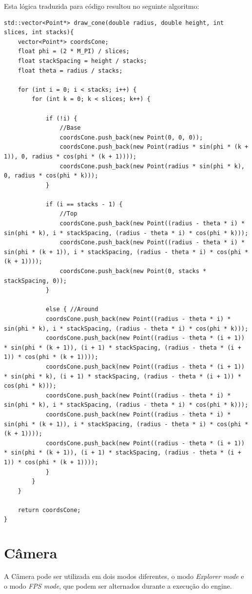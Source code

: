 \documentclass[a4paper]{article}
\begin{document}
Esta lógica traduzida para código resultou no seguinte algoritmo:

\begin{lstlisting}
std::vector<Point*> draw_cone(double radius, double height, int slices, int stacks){
    vector<Point*> coordsCone;
    float phi = (2 * M_PI) / slices;
    float stackSpacing = height / stacks;
    float theta = radius / stacks;

    for (int i = 0; i < stacks; i++) {
        for (int k = 0; k < slices; k++) {

            if (!i) {
                //Base
                coordsCone.push_back(new Point(0, 0, 0));
                coordsCone.push_back(new Point(radius * sin(phi * (k + 1)), 0, radius * cos(phi * (k + 1))));
                coordsCone.push_back(new Point(radius * sin(phi * k), 0, radius * cos(phi * k)));
            }

            if (i == stacks - 1) {
                //Top
                coordsCone.push_back(new Point((radius - theta * i) * sin(phi * k), i * stackSpacing, (radius - theta * i) * cos(phi * k)));
                coordsCone.push_back(new Point((radius - theta * i) * sin(phi * (k + 1)), i * stackSpacing, (radius - theta * i) * cos(phi * (k + 1))));
                coordsCone.push_back(new Point(0, stacks * stackSpacing, 0));
            }

            else { //Around
            coordsCone.push_back(new Point((radius - theta * i) * sin(phi * k), i * stackSpacing, (radius - theta * i) * cos(phi * k)));
            coordsCone.push_back(new Point((radius - theta * (i + 1)) * sin(phi * (k + 1)), (i + 1) * stackSpacing, (radius - theta * (i + 1)) * cos(phi * (k + 1))));
            coordsCone.push_back(new Point((radius - theta * (i + 1)) * sin(phi * k), (i + 1) * stackSpacing, (radius - theta * (i + 1)) * cos(phi * k)));
            coordsCone.push_back(new Point((radius - theta * i) * sin(phi * k), i * stackSpacing, (radius - theta * i) * cos(phi * k)));
            coordsCone.push_back(new Point((radius - theta * i) * sin(phi * (k + 1)), i * stackSpacing, (radius - theta * i) * cos(phi * (k + 1))));
            coordsCone.push_back(new Point((radius - theta * (i + 1)) * sin(phi * (k + 1)), (i + 1) * stackSpacing, (radius - theta * (i + 1)) * cos(phi * (k + 1))));
            }
        }
    }

    return coordsCone;
}

\end{lstlisting}

\section{Câmera}
A Câmera pode ser utilizada em dois modos diferentes, o modo \textit{Explorer mode} e o modo \textit{FPS mode}, que podem ser alternados durante a execução do engine.
\end{document}
